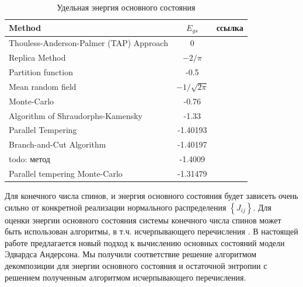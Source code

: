 \documentclass[utf8, babel, sor, jor, amsmath, amssymb, reprint]{elsarticle} %
\begin{document}
\begin{table}[!h]
	\begin{tabular}{|l|c|l|}
		\hline
		Method                                   & $E_{gs}$                                       & ссылка                                          \\ \hline
		Thouless-Anderson-Palmer (TAP) Approach & 0                                              & \cite{thouless1977solution}    \\ \hline
		Replica Method                            & $-2/\pi$                                       & \cite{sherrington1975solvable} \\ \hline
		Partition function                      & -0.5                                           & \cite{tanaka1980analytic}      \\ \hline
		Mean random field                       & $-1/\sqrt{2\pi}$                               & \cite{klein1976comparison}     \\ \hline
		Monte-Carlo                             & -0.76                                          & \cite{kirkpatrick1978infinite} \\ \hline
		Algorithm of Shraudorphs-Kamensky        & -1.33                                          & \cite{karandashev2019global}   \\ \hline
		Parallel Tempering   & -1.40193                                       & \cite{palmer1999ground}        \\ \hline
		  Branch-and-Cut Algorithm              & -1.40197                         
		                                        & \cite{campbell2004energy}      \\ \hline
		todo: метод                                        & -1.4009                                        & \cite{roma2009ground}          \\ \hline
		Parallel tempering Monte-Carlo  & -1.31479                                       & \cite{roma2009ground}          \\ \hline
		
	
		
	\end{tabular}
	\label{tab:Egs}
	\caption{Удельная энергия основного состояния}
\end{table}

Для конечного числа спинов, и энергия основного состояния будет зависеть очень сильно от конкретной реализации нормального распределения $\left\lbrace J_{ij} \right\rbrace $. Для оценки энергии основного состояния системы конечного числа спинов может быть использован алгоритмы, в т.ч. исчерпывающего перечисления \cite{padalko2021parallel}. В настоящей работе предлагается новый подход к вычислению основных состояний модели Эдвардса Андерсона. Мы получили соответствие решение алгоритмом декомпозиции для энергии основного состояния и остаточной энтропии с решением полученным алгоритмом исчерпывающего перечисления.  
\end{document}
